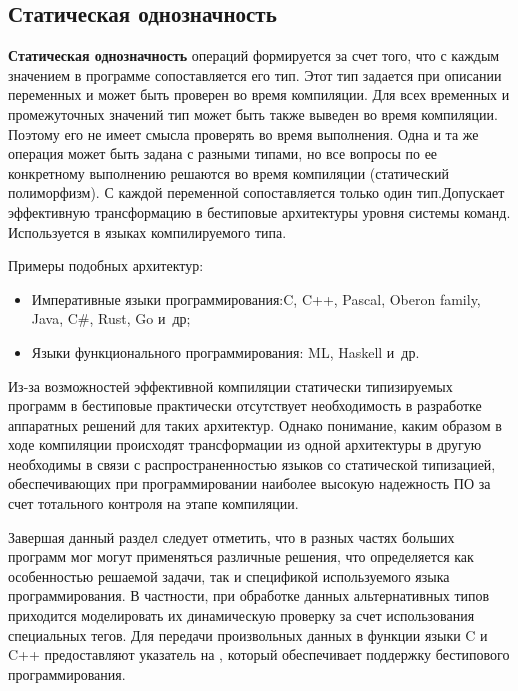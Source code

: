 \subsection{Статическая однозначность}

\textbf{Статическая однозначность} операций формируется за счет того, что с каждым значением в программе сопоставляется его тип. Этот тип задается при описании переменных и может быть проверен во время компиляции. Для всех временных и промежуточных значений тип может быть также выведен во время компиляции. Поэтому его не имеет смысла проверять во время выполнения. Одна и та же операция может быть задана с разными типами, но все вопросы по ее конкретному выполнению решаются во время компиляции (статический полиморфизм). С каждой переменной сопоставляется только один тип.Допускает эффективную трансформацию в бестиповые архитектуры уровня системы команд. Используется в языках компилируемого типа.

Примеры подобных архитектур:
\begin{itemize}
    \item Императивные языки программирования:C, C++, Pascal, Oberon family, Java, C\#, Rust, Go и~др;
    \item Языки функционального программирования: ML, Haskell и~др.
\end{itemize}
Из-за возможностей эффективной компиляции статически типизируемых программ в бестиповые практически отсутствует необходимость в разработке аппаратных решений для таких архитектур. Однако понимание, каким образом в ходе компиляции происходят трансформации из одной архитектуры в другую необходимы в связи с распространенностью языков со статической типизацией, обеспечивающих при программировании наиболее высокую надежность ПО за счет тотального контроля на этапе компиляции.

Завершая данный раздел следует отметить, что в разных частях больших программ мог могут применяться различные решения, что определяется как особенностью решаемой задачи, так и спецификой используемого языка программирования. В частности, при обработке данных альтернативных типов приходится моделировать их динамическую проверку за счет использования специальных тегов. Для передачи произвольных данных в функции языки C и C++ предоставляют указатель на , который обеспечивает поддержку бестипового программирования.